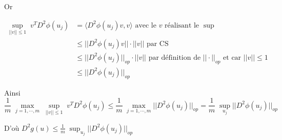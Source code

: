 \documentclass[a4paper, 11pt, french]{article}
\theoremstyle{definition}
\begin{document}
	Or
	
	\begin{align*}
		\sup_{||v|| \leq 1} \; v^T D^2 \phi (u_j) &= \langle D^2 \phi (u_j) v, v \rangle \text{ avec le $v$ réalisant le $\sup$ }\\
		&\leq ||D^2 \phi (u_j) v|| \cdot ||v|| \text{ par CS}\\
		&\leq ||D^2 \phi (u_j)||_{op} \cdot ||v|| \text{ par définition de $||\cdot||_{op}$ et car $||v|| \leq 1$} \\
		&\leq ||D^2 \phi (u_j)||_{op}
	\end{align*}
	
	Ainsi 
	\[\frac{1}{m} \; \max_{j=1,\cdots,m} \; \sup_{||v|| \leq 1} \; v^T D^2 \phi (u_j) \leq \frac{1}{m} \; \max_{j=1,\cdots,m} ||D^2 \phi (u_j)||_{op} = \frac{1}{m} \; \sup_{u_j} ||D^2 \phi (u_j)||_{op}\]
	
	D'où $D^2 g(u) \leq \frac{1}{m} \; \sup_{u_j} ||D^2 \phi (u_j)||_{op}$
	
	
\end{document}

